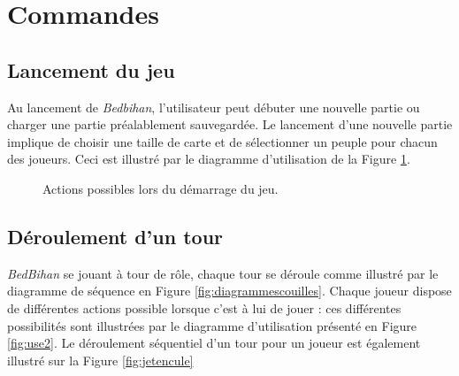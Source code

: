 \newpage
\section{Commandes}

		\subsection{Lancement du jeu}

		Au lancement de \emph{Bedbihan}, l'utilisateur peut débuter une nouvelle partie ou charger une partie préalablement sauvegardée. Le lancement d'une nouvelle partie implique de choisir une taille de carte et de sélectionner un peuple pour chacun des joueurs. Ceci est illustré par le diagramme d'utilisation de la {\sc Figure} \ref{fig:use1}.

		\begin{figure}
			\begin{center}
			\end{center}
			\caption{Actions possibles lors du démarrage du jeu.}
			\label{fig:use1}
		\end{figure}


	\subsection{Déroulement d'un tour}

		\emph{BedBihan} se jouant à tour de rôle, chaque tour se déroule comme illustré par le diagramme de séquence en {\sc Figure} \ref{fig:diagrammescouilles}. Chaque joueur dispose de différentes actions possible lorsque c'est à lui de jouer : ces différentes possibilités sont illustrées par le diagramme d'utilisation présenté en {\sc Figure} \ref{fig:use2}. Le déroulement séquentiel d'un tour pour un joueur est également illustré sur la {\sc Figure} \ref{fig:jetencule}
		